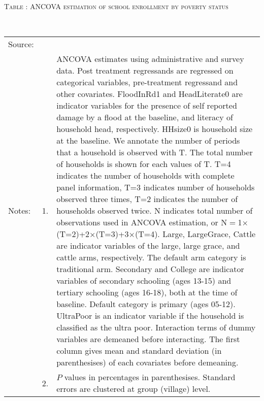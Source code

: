 \vspace{-3.0cm}
\hspace{-1cm}\begin{minipage}[t]{14cm}
\hfil\textsc{\normalsize Table \thetable: ANCOVA estimation of school enrollment by poverty status\label{tab ANCOVA enroll poverty}}\\
\setlength{\tabcolsep}{1pt}
\setlength{\baselineskip}{8pt}
\renewcommand{\arraystretch}{.5}
\hfil{}\\
\renewcommand{\arraystretch}{.8}
\setlength{\tabcolsep}{1pt}
\hspace{-1cm}\begin{tabular}{>{\hfill\scriptsize}p{1cm}<{}>{\hfill\scriptsize}p{.25cm}<{}>{\scriptsize}p{14cm}<{\hfill}}
Source:& \multicolumn{2}{l}{\scriptsize Estimated with GUK administrative and survey data.}\\
Notes: & 1. & ANCOVA estimates using administrative and survey data. Post treatment regressands are regressed on categorical variables, pre-treatment regressand and other covariates. \textsf{FloodInRd1} and \textsf{HeadLiterate0} are indicator variables for the presence of self reported damage by a flood at the baseline, and literacy of household head, respectively. \textsf{HHsize0} is household size at the baseline. We annotate the number of periods that a household is observed with \textsf{T}. The total number of households is shown for each values of \textsf{T}. \textsf{T=4} indicates the number of households with complete panel information, \textsf{T=3} indicates number of households observed three times, \textsf{T=2} indicates the number of households observed twice. \textsf{N} indicates total number of observations used in ANCOVA estimation, or \textsf{N$=$1$\times$(T=2)+2$\times$(T=3)+3$\times$(T=4)}.  \textsf{Large}, \textsf{LargeGrace}, \textsf{Cattle} are indicator variables of the \textsf{large}, \textsf{large grace}, and \textsf{cattle} arms, respectively. The default arm category is \textsf{traditional} arm. \textsf{Secondary} and \textsf{College} are indicator variables of secondary schooling (ages 13-15) and tertiary schooling (ages 16-18), both at the time of baseline. Default category is primary (ages 05-12). \textsf{UltraPoor} is an indicator variable if the household is classified as the ultra poor. Interaction terms of dummy variables are demeaned before interacting. The first column gives mean and standard deviation (in parenthesises) of each covariates before demeaning.\\
& 2. & $P$ values in percentages in parenthesises. Standard errors are clustered at group (village) level.%
\end{tabular}
\end{minipage}


